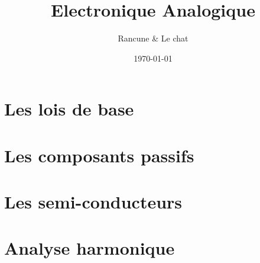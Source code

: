 \documentclass[a4paper,12pt]{book}
\title{Electronique Analogique}
\author{Rancune \& Le chat}
\date{\today}
\begin{document}
\maketitle

\frontmatter

\tableofcontents    



\mainmatter

\part{ Les lois de base }


%
%
%
%

\part{ Les composants passifs }

%
%
%

\part{ Les semi-conducteurs }

%
%
%

\part{ Analyse harmonique }


\appendix

\backmatter

\printindex

\end{document}
